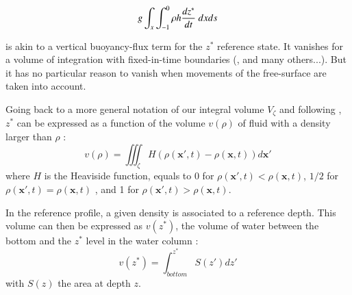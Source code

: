 \begin{equation}
\label{RHS_BPE_1}
g\int_{x} \int_{-1}^0 \rho h \frac{d z^*}{d t}\ dx ds \\
\end{equation}

is akin to a vertical buoyancy-flux term for the $z^*$ reference state. It vanishes for a volume of integration with fixed-in-time boundaries (\cite{winters_available_1995}, \cite{huang_mixing_1998} and many others...). But it has no particular reason to vanish when movements of the free-surface are taken into account.

Going back to a more general notation of our integral volume $V_{\zeta}$ and following \citet{huang_mixing_1998}, $z^*$ can be expressed as a function of the volume $v(\rho)$ of fluid with a density larger than $\rho$ :
\begin{equation}
v(\rho)=\iiint_{\zeta} H(\rho(\mathbf{x}',t)-\rho(\mathbf{x},t))d\mathbf{x}' %
\end{equation}
where $H$ is the Heaviside function, equals to 0 for $\rho(\mathbf{x}',t)<\rho(\mathbf{x},t)$, $1/2$ for $\rho(\mathbf{x}',t)=\rho(\mathbf{x},t)$ , and 1 for $\rho(\mathbf{x}',t)>\rho(\mathbf{x},t)$.

In the reference profile, a given density is associated to a reference depth. This volume can then be expressed as $v(z^*)$, the volume of water between the bottom and the $z^*$ level in the water column :
\begin{equation}
v(z^*)=\int^{z^*}_{bottom} S(z')dz'
\end{equation}
with $S(z)$ the area at depth $z$.


